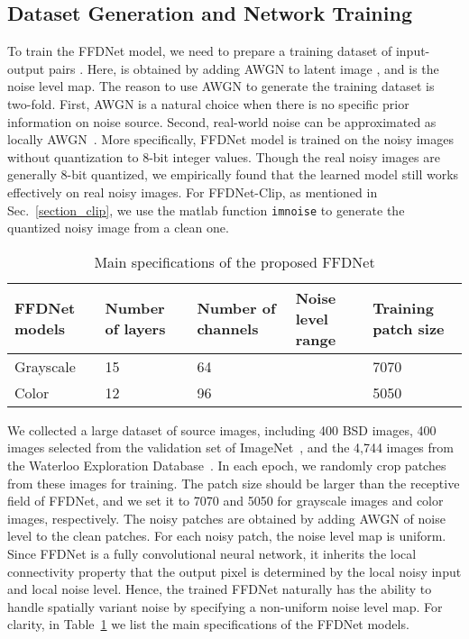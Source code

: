 \documentclass[journal]{IEEEtran}
\begin{document}
\subsection{Dataset Generation and Network Training}\label{section_train}
To train the FFDNet model, we need to prepare a training dataset of input-output pairs . Here,  is obtained by adding AWGN to latent image , and  is the noise level map.
The reason to use AWGN to generate the training dataset is two-fold. First, AWGN is a natural choice when there is no specific prior information on noise source. Second, real-world noise can be approximated as locally AWGN~\cite{lee1981refined}. More specifically, FFDNet model is trained on the noisy images  without quantization to 8-bit integer values.
Though the real noisy images are generally 8-bit quantized, we empirically found that the learned model still works effectively on real noisy images.
For FFDNet-Clip, as mentioned in Sec.~\ref{section_clip}, we use the matlab function \texttt{imnoise} to generate the  quantized noisy image from a clean one.


\begin{table}[!tbp]\footnotesize{}
\caption{Main specifications of the proposed FFDNet}
\center
\begin{tabular}{|p{1.1cm}<{\centering}|p{1.2cm}<{\centering}|p{1.3cm}<{\centering}|p{1.4cm}<{\centering}|p{1.4cm}<{\centering}|}
  \hline\rowcolor[gray]{.9}
  FFDNet models    & Number of layers   & Number of channels   & Noise level range   & Training patch size    \\ \hline
  Grayscale      & 15 &  64   &   & 7070    \\\hline
  Color      & 12  &  96  &   & 5050     \\
  \hline
\end{tabular}\label{table_network}
\end{table}







We collected a large dataset of source images, including 400 BSD images, 400 images selected from the validation set of ImageNet~\cite{deng2009imagenet}, and the 4,744 images from the Waterloo Exploration Database~\cite{ma2016gmad}.
In each epoch, we randomly crop  patches from these images for training.
The patch size should be larger than the receptive field of FFDNet, and we set it to 7070 and 5050 for grayscale images and color images, respectively. The noisy patches are obtained by adding AWGN of noise level   to the clean patches.
For each noisy patch, the noise level map is uniform. Since FFDNet is a fully convolutional neural network, it inherits the local connectivity property that the output pixel is determined by the local noisy input and local noise level. Hence, the trained FFDNet naturally has the ability to handle spatially variant noise by specifying a non-uniform noise level map. For clarity, in Table~\ref{table_network} we list the main specifications of the FFDNet models.
\end{document}
